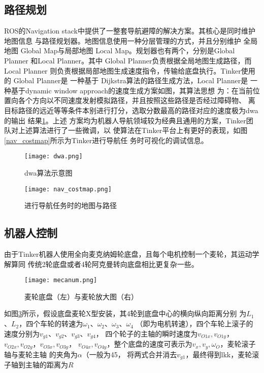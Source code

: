 \subsection{路径规划}

ROS的Navigation stack中提供了一整套导航避障的解决方案。其核心是同时维护地图信息
与路径规划器。地图信息使用一种分层管理的方式\cite{lu2014layered}，并且分别维护
全局地图 Global Map与局部地图 Local Map。规划器也有两个，分别是Global Planner
和Local Planner。其中 Global Planner负责根据全局地图生成路径，而 Local Planner
则负责根据局部地图生成速度指令，传输给底盘执行。Tinker使用的 Global Planner是
一种基于 Dijkstra算法\cite{deng2012fuzzy}的路径生成方法，Local Planner是
一种基于dynamic window approach的速度生成方案\cite{fox1997dynamic}如图，其算法思想
为：在当前位置向各个方向以不同速度发射模拟路径，并且按照这些路径是否经过障碍物、
离目标路径的远近等等条件本别进行打分，选取分数最高的路径对应的速度极为dwa的输出
结果\ref{fig:dwa}。上述
方案均为机器人导航领域较为经典且通用的方案，Tinker团队对上述算法进行了一些微调，以
使算法在Tinker平台上有更好的表现，如图\ref{nav_costmap}所示为Tinker进行导航任
务时可视化的调试信息。


\begin{figure}[h] %
  \centering
  \texttt{[image: dwa.png]}
  \caption{dwa算法示意图}
  \label{fig:dwa}
\end{figure}


\begin{figure}[h] %
  \centering
  \texttt{[image: nav\_costmap.png]}
  \caption{进行导航任务时的地图与路径}
  \label{fig:nav_costmap}
\end{figure}

\subsection{机器人控制}

由于Tinker机器人使用全向麦克纳姆轮底盘，且每个电机控制一个麦轮，其运动学解算同
传统2轮底盘或者4轮阿克曼转向底盘相比更复杂一些。


\begin{figure}[h] %
  \centering
  \texttt{[image: mecanum.png]}
  \caption{麦轮底盘（左）与麦轮放大图（右）}
  \label{fig:mecanum}
\end{figure}

如图\ref{fig:mecanum}所示，假设底盘麦轮X型安装，其4轮到底盘中心的横向纵向距离分别
为$L_1$、$L_2$，四个车轮的转速为$\omega_1$、$\omega_2$、$\omega_3$、$\omega_4$
（即为电机转速），四个车轮上滚子的速度分别为$v_{g1}$、$v_{g2}$、$v_{g3}$、$v_{g4}$，
四个轮子的主轴的瞬时速度为$v_{O1x}, v_{O1y}$，$v_{O2x}, v_{O2y}$，$v_{O3x}, v_{O3y}$，
$v_{O4x}, v_{O4y}$，整个底盘的速度可表示为$v_x, v_y, \omega_O$，麦轮滚子轴与麦轮主轴
的夹角为$\alpha$（一般为45，
将两式合并消去$v_{g1}$，最终得到lkk，麦轮滚子轴到主轴的距离为$R$


